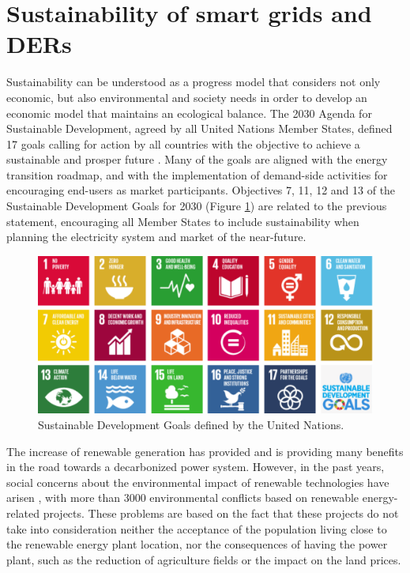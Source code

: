 \section{Sustainability of smart grids and DERs}
Sustainability can be understood as a progress model that considers not only economic, but also environmental and society needs in order to develop an economic model that maintains an ecological balance. The 2030 Agenda for Sustainable Development, agreed by all United Nations Member States, defined 17 goals calling for action by all countries with the objective to achieve a sustainable and prosper future \cite{SDGOALS2015}. Many of the goals are aligned with the energy transition roadmap, and with the implementation of demand-side activities for encouraging end-users as market participants. Objectives 7, 11, 12 and 13 of the Sustainable Development Goals for 2030 (Figure \ref{fig:sdg}) are related to the previous statement, encouraging all Member States to include sustainability when planning the electricity system and market of the near-future.  

\begin{figure}[h]
	\centering 
	\includegraphics[width=1\columnwidth ]{ChapterIntro/Figures/SDG.png}
		\caption{Sustainable Development Goals defined by the United Nations.}  
		\label{fig:sdg}
\end{figure}    

The increase of renewable generation has provided and is providing many benefits in the road towards a decarbonized power system. However, in the past years, social concerns about the environmental impact of renewable technologies have arisen \cite{Temper2020}, with more than 3000 environmental conflicts based on renewable energy-related projects. These problems are based on the fact that these projects do not take into consideration neither the acceptance of the population living close to the renewable energy plant location, nor the consequences of having the power plant, such as the reduction of agriculture fields or the impact on the land prices. 


